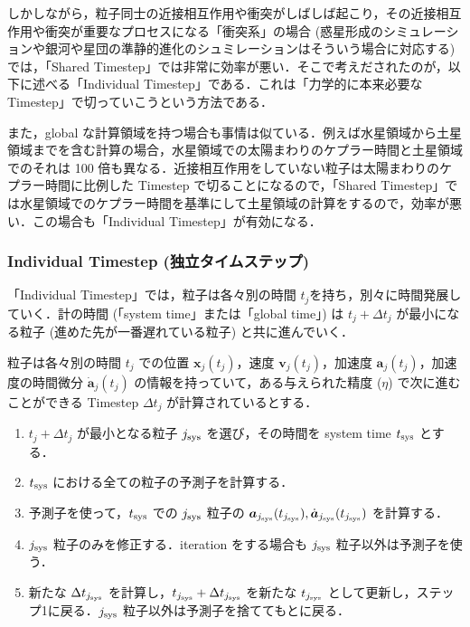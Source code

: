 \documentclass[11pt,a4paper,oneside,onecolumn]{jreport}
\begin{document}
しかしながら，粒子同士の近接相互作用や衝突がしばしば起こり，その近接相互作用や衝突が重要なプロセスになる「衝突系」の場合 (惑星形成のシミュレーションや銀河や星団の準静的進化のシュミレーションはそういう場合に対応する) では，「Shared Timestep」では非常に効率が悪い．そこで考えだされたのが，以下に述べる「Individual Timestep」である．これは「力学的に本来必要な Timestep」で切っていこうという方法である．

また，global な計算領域を持つ場合も事情は似ている．例えば水星領域から土星領域までを含む計算の場合，水星領域での太陽まわりのケプラー時間と土星領域でのそれは 100 倍も異なる．近接相互作用をしていない粒子は太陽まわりのケプラー時間に比例した Timestep で切ることになるので，「Shared Timestep」では水星領域でのケプラー時間を基準にして土星領域の計算をするので，効率が悪い．この場合も「Individual Timestep」が有効になる．

\subsubsection{Individual Timestep (独立タイムステップ) }
「Individual Timestep」では，粒子は各々別の時間 $t_j$を持ち，別々に時間発展していく．計の時間 (「system time」または「global time」) は $t_j + \Delta t_j$ が最小になる粒子 (進めた先が一番遅れている粒子) と共に進んでいく．

粒子は各々別の時間 $t_j$ での位置 ${\bm x}_j (t_j)$，速度 ${\bm v}_j (t_j)$，加速度 ${\bm a}_j (t_j)$，加速度の時間微分 $\dot{{\bm a}}_j (t_j)$ の情報を持っていて，ある与えられた精度 ($\eta$) で次に進むことができる Timestep $\Delta t_j$ が計算されているとする．

\begin{enumerate}
\item $t_j + \Delta t_j$ が最小となる粒子 $j_{{\rm sys}}$ を選び，その時間を system time $t_{{\rm sys}}$ とする．
\item $t_{{\rm sys}}$ における全ての粒子の予測子を計算する．
\item 予測子を使って，$t_{{\rm sys}}$ での $j_{{\rm sys}}$ 粒子の ${\bm a}_{j_{{\rm sys}}}(t_{j_{{\rm sys}}}), \dot{{\bm a}}_{j_{{\rm sys}}} (t_{j_{{\rm sys}}})$ を計算する．
\item $j_{{\rm sys}}$ 粒子のみを修正する．iteration をする場合も $j_{{\rm sys}}$ 粒子以外は予測子を使う．
\item 新たな $\Delta t_{j_{{\rm sys}}}$  を計算し，$t_{j_{{\rm sys}}} + \Delta t_{j_{{\rm sys}}}$ を新たな $t_{j_{{\rm sys}}}$ として更新し，ステップ1に戻る．$j_{{\rm sys}}$ 粒子以外は予測子を捨ててもとに戻る．
\end{enumerate}
\end{document}
